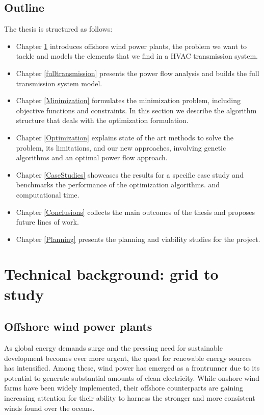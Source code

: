 \documentclass[a4paper,11pt, titlepage, twoside]{article}
\begin{document}
\subsection{Outline}

The thesis is structured as follows:
\begin{itemize}
    \item Chapter \ref{Grid} introduces offshore wind power plants, the problem we want to tackle and models the elements that we find in a HVAC transmission system.
    \item Chapter \ref{fulltransmission} presents the power flow analysis and builds the full transmission system model. 
    \item Chapter \ref{Minimization}  formulates the minimization problem, including objective functions and constraints. In this section we describe
    the algorithm structure that deals with the optimization formulation.
    \item Chapter \ref{Optimization} explains state of the art methods to solve the problem, its limitations, and our new approaches, involving
    genetic algorithms and  an optimal power flow approach.
    \item Chapter \ref{CaseStudies} showcases  the results for a specific case study and benchmarks the performance of the optimization algorithms.
    and computational time.
    \item Chapter \ref{Conclusions} collects the main outcomes of the thesis and proposes future lines of work.
    \item Chapter \ref{Planning} presents the planning and viability studies for the project.
\end{itemize}
\section{Technical background: grid to study}\label{Grid}

\subsection{Offshore wind power plants}
As global energy demands surge and the pressing need for sustainable development becomes ever more urgent, 
the quest for renewable energy sources has intensified. Among these, wind power has emerged as a frontrunner due to its potential to generate substantial amounts of clean electricity.
While onshore wind farms have been widely implemented, their offshore counterparts are gaining increasing attention for their ability to harness the stronger and more consistent winds found over the oceans.\par
\end{document}
